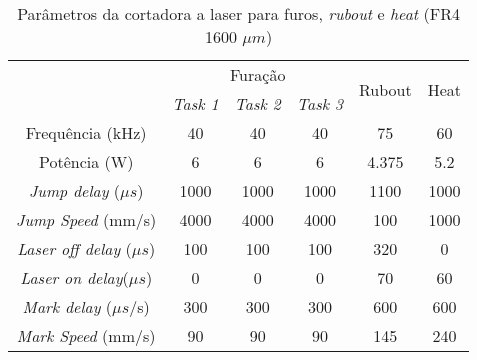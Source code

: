 \begin{table}[htbp]
\caption{Parâmetros da cortadora a laser para furos, \textit{rubout} e \textit{heat} (FR4 1600 $\mu m$)}
\label{parametros}
\begin{tabular}{c|ccc|c|c|}
\cline{2-6}
                                           & \multicolumn{3}{c|}{Furação}                                                         & \multirow{2}{*}{Rubout} & \multirow{2}{*}{Heat} \\ \cline{2-4}
                                           & \multicolumn{1}{c|}{\textit{Task 1}}       & \multicolumn{1}{c|}{\textit{Task 2}}       & \textit{Task 3}       &                         &                       \\ \hline
\multicolumn{1}{|c|}{Frequência (kHz)}     & \multicolumn{1}{c|}{40}           & \multicolumn{1}{c|}{40}           & 40           & 75                      & 60                    \\ \hline
\multicolumn{1}{|c|}{Potência (W)}         & \multicolumn{1}{c|}{6}            & \multicolumn{1}{c|}{6}            & 6            & 4.375                   & 5.2                   \\ \hline
\multicolumn{1}{|c|}{\textit{Jump delay} ($\mu s$)}      & \multicolumn{1}{c|}{1000}         & \multicolumn{1}{c|}{1000}         & 1000         & 1100                    & 1000                  \\ \hline
\multicolumn{1}{|c|}{\textit{Jump Speed} (mm/s)}    & \multicolumn{1}{c|}{4000}         & \multicolumn{1}{c|}{4000}         & 4000         & 100                     & 1000                  \\ \hline
\multicolumn{1}{|c|}{\textit{Laser off delay} ($\mu s$)} & \multicolumn{1}{c|}{100}          & \multicolumn{1}{c|}{100}          & 100          & 320                     & 0                     \\ \hline
\multicolumn{1}{|c|}{\textit{Laser on delay}($\mu s$)}  & \multicolumn{1}{c|}{0}            & \multicolumn{1}{c|}{0}            & 0            & 70                      & 60                    \\ \hline
\multicolumn{1}{|c|}{\textit{Mark delay} ($\mu s$/s)}    & \multicolumn{1}{c|}{300}          & \multicolumn{1}{c|}{300}          & 300          & 600                     & 600                   \\ \hline
\multicolumn{1}{|c|}{\textit{Mark Speed} (mm/s)}    & \multicolumn{1}{c|}{90}           & \multicolumn{1}{c|}{90}           & 90           & 145                     & 240                   \\ \hline

\end{tabular}
\end{table}
